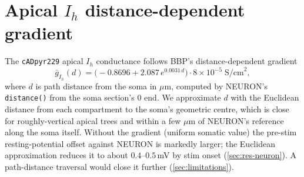 \section{Apical \texorpdfstring{$I_h$}{Ih} distance-dependent
gradient}\label{app:ih-gradient}

The \texttt{cADpyr229} apical $I_h$ conductance follows BBP's
distance-dependent gradient
\[
  \bar{g}_{I_h}(d)
    = \bigl(-0.8696 + 2.087\,e^{0.0031\,d}\bigr)
      \cdot 8\!\times\!10^{-5}\;\mathrm{S/cm}^2,
\]
where $d$ is path distance from the soma in $\mu$m, computed by
NEURON's \texttt{distance()} from the soma section's 0 end. We
approximate $d$ with the Euclidean distance from each compartment to
the soma's geometric centre, which is close for roughly-vertical
apical trees and within a few $\mu$m of NEURON's reference along the
soma itself. Without the gradient
(uniform somatic value) the pre-stim resting-potential offset against
NEURON is markedly larger; the Euclidean approximation reduces it to
about $0.4\text{--}0.5\,$mV by stim onset (\cref{sec:res-neuron}).
A path-distance traversal would close it further
(\cref{sec:limitations}).


